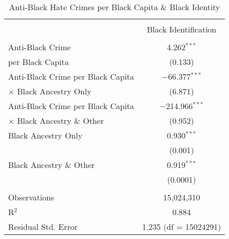 \documentclass{article}
\begin{document}
        \begin{table}[!htbp] \centering
          \caption{Anti-Black Hate Crimes per Black Capita \& Black Identity} 
          \begin{tabular}{@{\extracolsep{5pt}}lc} 
            \\[-1.8ex]\hline 
            \hline \\[-1.8ex] 
             & \multicolumn{1}{c}{\small{Black Identification}} \\ 
            \hline \\[-1.8ex] 
             Anti-Black Crime & 4.262$^{***}$ \\
             per Black Capita & \small{(0.133)} \\     
             Anti-Black Crime per Black Capita & $-$66.377$^{***}$ \\ 
             $\times$ Black Ancestry Only & \small{(6.871)} \\ 
             Anti-Black Crime per Black Capita   & $-$214.966$^{***}$ \\ 
             $\times$ Black Ancestry \& Other & \small{(0.952)} \\           
             Black Ancestry Only & 0.930$^{***}$ \\ 
              & \small{(0.001)} \\ 
             Black Ancestry \& Other & 0.919$^{***}$ \\ 
              & \small{(0.0001)} \\ 
            \hline \\[-1.8ex] 
            Observations & 15,024,310 \\ 
            R$^{2}$ & 0.884 \\ 
            Residual Std. Error & 1.235 (df = 15024291) \\ 
        \end{tabular} 
        \label{tab:vio_any_anti_blkcap_yr}
        \end{table} 
        
\end{document}
